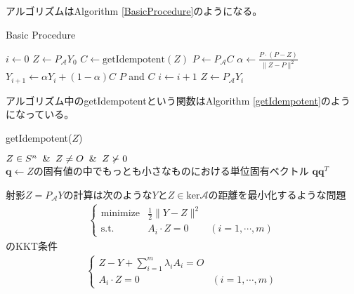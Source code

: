 アルゴリズムはAlgorithm \ref{BasicProcedure}のようになる。
\begin{algorithm}
  \caption{Basic Procedure}
  \label{BasicProcedure}
  \begin{algorithmic}[1]
    \State $i \leftarrow 0$
    \State $Z \leftarrow P_\mathcal{A} Y_0$
      \State $C \leftarrow \text{getIdempotent}(Z)$
      \State $P \leftarrow P_\mathcal{A} C$
        \State $\alpha \leftarrow \displaystyle{\frac{P \cdot (P - Z)}{\|Z - P\|^2}}$
        \State $Y_{i + 1} \leftarrow \alpha Y_i + (1 - \alpha) C$
      \Else
        \State \Return $P$ and $C$
      \EndIf
      \State $i \leftarrow i + 1$
      \State $Z \leftarrow P_\mathcal{A} Y_i$
    \EndWhile
  \end{algorithmic}
\end{algorithm}
アルゴリズム中のgetIdempotentという関数はAlgorithm \ref{getIdempotent}のようになっている。
\begin{algorithm}
  \caption{getIdempotent($Z$)}
  \label{getIdempotent}
  \begin{algorithmic}[1]
    \Input $Z \in S^n \And Z \not= O \And Z \not\succ 0$
    \State $\mathbf{q} \leftarrow Z\text{の固有値の中でもっとも小さなものにおける単位固有ベクトル}$
    \State \Return $\mathbf{q} \mathbf{q}^T$
  \end{algorithmic}
\end{algorithm}
射影$Z = P_\mathcal{A} Y$の計算は次のような$Y$と$Z \in \mathrm{ker} \mathcal{A}$の距離を最小化するような問題
\begin{align*}
  \left\{
    \begin{array}{lll}
      \text{minimize} & \displaystyle{\frac{1}{2}} \|Y - Z\|^2 & \\
      \text{s.t.}     & A_i \cdot Z = 0         & (i = 1, \cdots, m)
    \end{array}
  \right.
\end{align*}
のKKT条件
\begin{align*}
  \left\{
    \begin{array}{ll}
      Z - Y + \displaystyle{\sum_{i = 1}^m} \lambda_i A_i = O & \\
      A_i \cdot Z = 0                                         & (i = 1, \cdots, m)
    \end{array}
  \right.
\end{align*}
